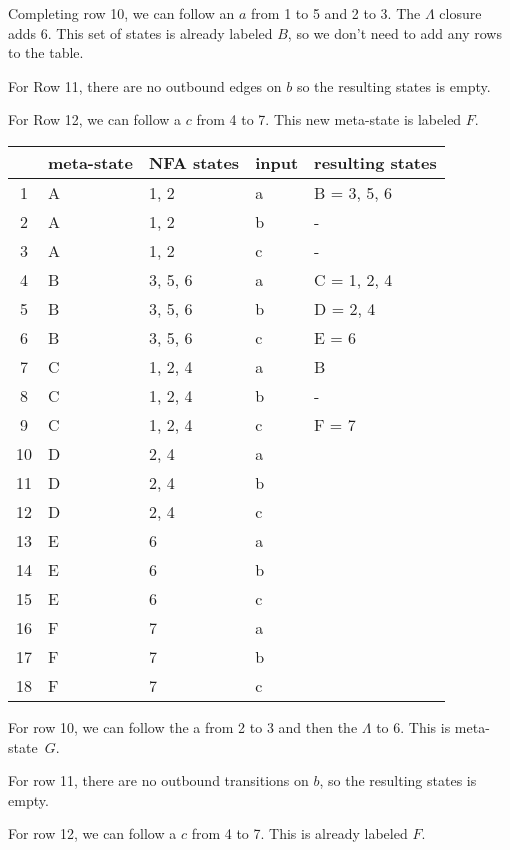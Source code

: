 \documentclass[letterpaper,12pt,openany,reqno]{book}%
\begin{document}
Completing row 10, we can follow an $a$ from 1 to 5 and 2 to 3. The $\Lambda$ closure adds 6. This set of states is already labeled $B$, so we don't need to add any rows to the table.

For Row 11, there are no outbound edges on $b$ so the resulting states is empty.

For Row 12, we can follow a $c$ from 4 to 7. This new meta-state is labeled $F$.

\begin{center}
\small
\begin{tabular}{c|l|l|l|l}
\hline
& \textbf{meta-state} & \textbf{NFA states} & \textbf{input} & \textbf{resulting states} \\
\hline
1 & A & 1, 2 & a & B = 3, 5, 6 \\
2 & A & 1, 2 & b & - \\
3 & A & 1, 2 & c & - \\
4 & B & 3, 5, 6 & a & C = 1, 2, 4 \\
5 & B & 3, 5, 6 & b & D = 2, 4 \\
6 & B & 3, 5, 6 & c & E = 6 \\
7 & C & 1, 2, 4 & a & B\\
8 & C & 1, 2, 4 & b & -\\
9 & C & 1, 2, 4 & c & F = 7 \\
10 & D & 2, 4 & a & \\
11 & D & 2, 4 & b & \\
12 & D & 2, 4 & c & \\
13 & E & 6 & a & \\
14 & E & 6 & b & \\
15 & E & 6 & c & \\
16 & F & 7 & a & \\
17 & F & 7 & b & \\
18 & F & 7 & c & \\
\hline
\end{tabular}
\end{center}

For row 10, we can follow the a from 2 to 3 and then the $\Lambda$ to 6. This is meta-state~$G$.

For row 11, there are no outbound transitions on $b$, so the resulting states is empty.

For row 12, we can follow a $c$ from 4 to 7. This is already labeled $F$.
\end{document}
